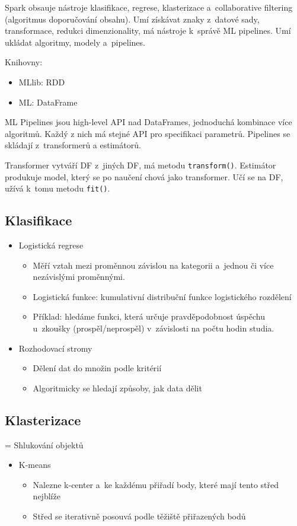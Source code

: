 Spark obsauje nástroje klasifikace, regrese, klasterizace a~collaborative filtering (algoritmus doporučování obsahu). Umí získávat znaky z~datové sady, transformace, redukci dimenzionality, má nástroje k~správě ML pipelines. Umí ukládat algoritmy, modely a~pipelines.

Knihovny:
\begin{itemize}
    \item MLlib: RDD
    \item ML: DataFrame
\end{itemize}

ML Pipelines jsou high-level API nad DataFrames, jednoduchá kombinace více algoritmů. Každý z nich má stejné API pro specifikaci parametrů. Pipelines se skládají z~transformerů a estimátorů.

Transformer vytváří DF z~jiných DF, má metodu \texttt{transform()}. Estimátor produkuje model, který se po naučení chová jako transformer. Učí se na DF, užívá k~tomu metodu \texttt{fit()}.

\subsection{Klasifikace}
\begin{itemize}
    \item Logistická regrese
    \begin{itemize}
        \item Měří vztah mezi proměnnou závislou na kategorii a~jednou či více nezávislými proměnnými.
        \item Logistická funkce: kumulativní distribuční funkce logistického rozdělení
        \item Příklad: hledáme funkci, která určuje pravděpodobnost úspěchu u~zkoušky (prospěl/neprospěl) v~závislosti na počtu hodin studia.
    \end{itemize}
    \item Rozhodovací stromy
    \begin{itemize}
        \item Dělení dat do množin podle kritérií
        \item Algoritmicky se hledají způsoby, jak data dělit
    \end{itemize}
\end{itemize}

\subsection{Klasterizace}
= Shlukování objektů
\begin{itemize}
    \item K-means
    \begin{itemize}
        \item Nalezne k-center a~ke každému přiřadí body, které mají tento střed nejblíže
        \item Střed se iterativně posouvá podle těžiště přiřazených bodů
    \end{itemize}
\end{itemize}

